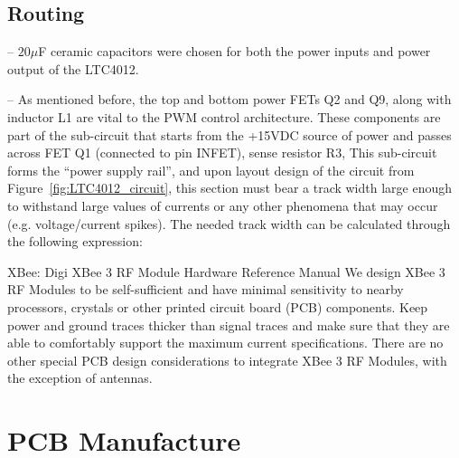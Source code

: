 \subsection{Routing}\label{sec:52_Routing}




-- $20 \mu$F ceramic capacitors were chosen for both the power inputs and power output of the LTC4012. 

-- As mentioned before, the top and bottom power FETs Q2 and Q9, along with inductor L1 are vital to the PWM control architecture. These components are part of the sub-circuit that starts from the +15VDC source of power and passes across FET Q1 (connected to pin INFET), sense resistor R3, 
This sub-circuit forms the ``power supply rail'', and upon layout design of the circuit from Figure~\ref{fig:LTC4012_circuit}, this section must bear a track width large enough to withstand large values of currents or any other phenomena that may occur (e.g. voltage/current spikes). The needed track width can be calculated through the following expression:

XBee: Digi XBee 3 RF Module Hardware Reference Manual
We design XBee 3 RF Modules to be self-sufficient and have minimal sensitivity to nearby processors,
crystals or other printed circuit board (PCB) components. Keep power and ground traces thicker than
signal traces and make sure that they are able to comfortably support the maximum current
specifications. There are no other special PCB design considerations to integrate XBee 3 RF Modules,
with the exception of antennas.

\section{PCB Manufacture}\label{sec:51_PCBmanufacture}

